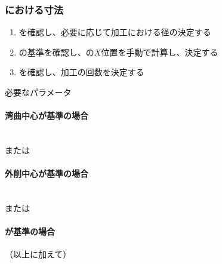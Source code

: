 \subsubsection{\Keyway における寸法}
\begin{enumerate}\item \KeywayType を確認し、必要に応じて加工における径の決定する
\item {}\nameKeywayCenter の基準を確認し、\KeywayCenter の$X$位置を手動で計算し、決定する
\item \KeywayWidth を確認し、加工の回数を決定する
\end{enumerate}
\begin{Parameter}{必要なパラメータ}
\paragraph*{湾曲中心が基準の場合}
\PMKeywayACOD
\PMKeywayBDOD
\PMKeywayPos
\PMKeywayWidth
\PMCenterCurvature\\
\PMKeywayCornerR または\PMKeywayCornerC
\tcbline*
\paragraph*{外削中心が基準の場合}
\PMKeywayACOD
\PMKeywayBDOD
\PMKeywayPos
\PMKeywayWidth\\
\PMKeywayCornerR または\PMKeywayCornerC
\tcbline*
\paragraph*{\AsideKeywayDepth が基準の場合}
（以上に加えて）\PMAsideKeywayDepth
\end{Parameter}

\clearpage
